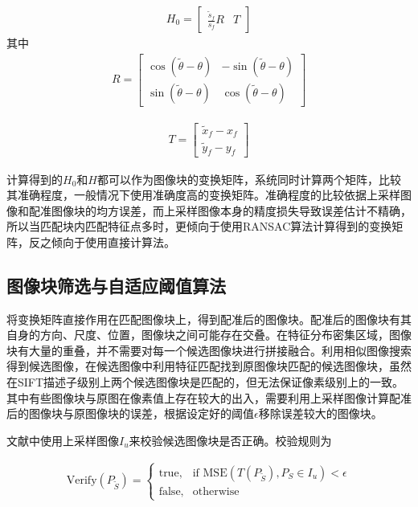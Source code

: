 \documentclass[UTF8]{csoarticle}
\begin{document}
\begin{align}
  H_0 = 
  \begin{bmatrix}
  \frac{\tilde{s}_f}{s_f} R & T
  \end{bmatrix}
\end{align}
其中
\begin{align}
  R = 
  \begin{bmatrix}
    \cos{(\tilde{\theta}-\theta)} & -\sin{(\tilde{\theta}-\theta)} \\
    \sin{(\tilde{\theta}-\theta)} & \cos{(\tilde{\theta}-\theta)} 
  \end{bmatrix}
\end{align}

\begin{align}
  T = 
  \begin{bmatrix}
    \tilde{x}_f - x_f \\
    \tilde{y}_f - y_f
  \end{bmatrix}
\end{align}

计算得到的\(H_0\)和\(H\)都可以作为图像块的变换矩阵，系统同时计算两个矩阵，比较其准确程度，一般情况下使用准确度高的变换矩阵。准确程度的比较依据上采样图像和配准图像块的均方误差，而上采样图像本身的精度损失导致误差估计不精确，所以当匹配块内匹配特征点多时，更倾向于使用RANSAC算法计算得到的变换矩阵，反之倾向于使用直接计算法。

\subsection{图像块筛选与自适应阈值算法}
将变换矩阵直接作用在匹配图像块上，得到配准后的图像块。配准后的图像块有其自身的方向、尺度、位置，图像块之间可能存在交叠。在特征分布密集区域，图像块有大量的重叠，并不需要对每一个候选图像块进行拼接融合。利用相似图像搜索得到候选图像，在候选图像中利用特征匹配找到原图像块匹配的候选图像块，虽然在SIFT描述子级别上两个候选图像块是匹配的，但无法保证像素级别上的一致。其中有些图像块与原图在像素值上存在较大的出入，需要利用上采样图像计算配准后的图像块与原图像块的误差，根据设定好的阈值\(\epsilon\)移除误差较大的图像块。

文献\cite{Dai:2012vn}中使用上采样图像\(I_u\)来校验候选图像块是否正确。校验规则为

\begin{align}
\label{eq:errorControl}
  \text{Verify}(P_{\tilde{S}}) = 
\begin{cases} 
\text{true}, & \mbox{if MSE} (T(P_{\tilde{S}}),P_S \in I_u) < \epsilon \\
\text{false}, & \mbox{otherwise}
\end{cases}
\end{align}
\end{document}
